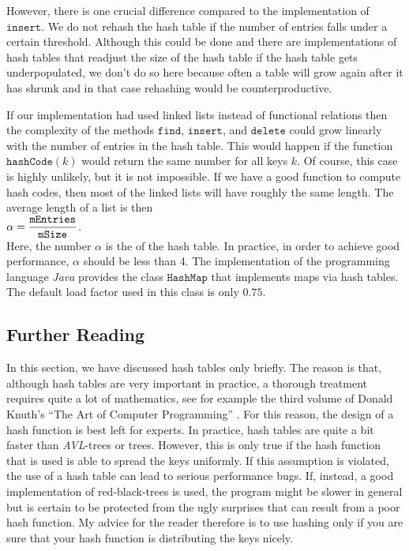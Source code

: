 However, there is one crucial difference compared to the implementation of $\mathtt{insert}$.
We do not rehash the hash table if the number of entries falls under a certain threshold.
Although this could be done and there are implementations of hash tables that readjust the size of the
hash table if the hash table gets underpopulated, we don't do so here because often a table will
grow again after it has shrunk and in that case rehashing would be counterproductive.

If our implementation had used linked lists instead of functional relations then the complexity of
the methods  $\mathtt{find}$, $\mathtt{insert}$, and $\mathtt{delete}$ could grow linearly with the number
of entries in the hash table.  This would happen if the function 
$\mathtt{hashCode}(k)$ would return the same number for all keys $k$.  Of course, this case is
highly unlikely, but it is not impossible.  If we have a good function to compute hash codes, then
most of the linked lists will have roughly the same length.  The average length of a list is then
 \\[0.2cm]
\hspace*{1.3cm}
 $\alpha = \displaystyle \frac{\mathtt{mEntries}}{\mathtt{mSize}}$. 
\\[0.2cm]
Here, the number $\alpha$ is the  of the hash table.  In practice, in order to
achieve good performance, $\alpha$ should be less than 4.  The implementation of the programming
language \textsl{Java} provides the class  $\mathtt{HashMap}$ that implements maps via hash tables.
The default load factor used in this class is only $\mathtt{0.75}$.


\subsection{Further Reading}
In this section, we have discussed hash tables only briefly.  The reason is that, although hash tables are very
important in practice, a thorough treatment requires quite a lot of mathematics, see for example the
third volume of Donald Knuth's ``The Art of Computer Programming'' \cite{knuth:1998b}.  For this
reason, the design of a hash function is best left for experts.  In practice, hash tables are
quite a bit faster than \textsl{AVL}-trees or  trees.  However, this is only true if
the hash function that is used is able to spread the keys uniformly.  If this assumption is
violated, the use of a hash table can lead to serious performance 
bugs.  If, instead, a good
implementation of red-black-trees is used, the program might be slower in general but is certain to
be protected from the ugly surprises that can result from a poor hash function.  My advice for the reader
therefore is to use hashing only if you are sure that your hash function is distributing the keys nicely.


